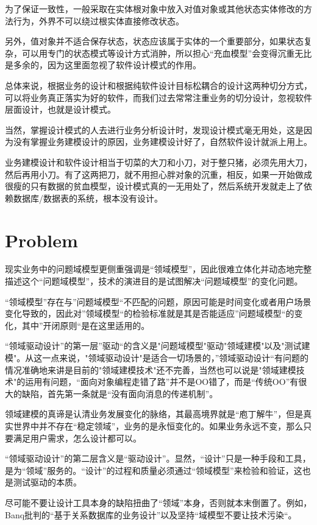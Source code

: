 为了保证一致性，一般采取在实体根对象中放入对值对象或其他状态实体修改的方法行为，外界不可以绕过根实体直接修改状态。

另外，值对象并不适合保存状态，状态应该属于实体的一个重要部分，如果状态复杂，可以用专门的状态模式等设计方式消肿，所以担心“充血模型”会变得沉重无比是多余的，因为这里面忽视了软件设计模式的作用。


总体来说，根据业务的设计和根据纯软件设计目标松耦合的设计这两种切分方式，可以将业务真正落实为好的软件，而我们过去常常注重业务的切分设计，忽视软件层面设计，也就是设计模式。


当然，掌握设计模式的人去进行业务分析设计时，发现设计模式毫无用处，这是因为没有掌握业务建模设计的原因，业务建模设计好了，自然软件设计就派上用上。

业务建模设计和软件设计相当于切菜的大刀和小刀，对于整只猪，必须先用大刀，然后再用小刀。有了这两把刀，就不用担心胖对象的沉重，相反，如果一开始做成很瘦的只有数据的贫血模型，设计模式真的一无用处了，然后系统开发就走上了依赖数据库/数据表的系统，根本没有设计。

\section{Problem}

现实业务中的问题域模型更侧重强调是“领域模型”，因此很难立体化并动态地完整描述这个“问题域模型”，技术的演进目的是试图解决“问题域模型”的变化问题。

“领域模型”存在与”问题域模型“不匹配的问题，原因可能是时间变化或者用户场景变化导致的，因此对”领域模型“的检验标准就是其是否能适应”问题域模型“的变化，其中”开闭原则“是在这里适用的。

“领域驱动设计”的第一层”驱动“的含义是"问题域模型"驱动"领域建模"以及"测试建模"。从这一点来说，"领域驱动设计"是适合一切场景的，”领域驱动设计“有问题的情况准确地来讲是目前的"领域建模技术"还不完善，当然也可以说是"领域建模技术"的运用有问题，“面向对象编程走错了路”并不是OO错了，而是“传统OO”有很大的缺陷，首先第一条就是“没有面向消息的传递机制”。

领域建模的真谛是认清业务发展变化的脉络，其最高境界就是“庖丁解牛”，但是真实世界中并不存在“稳定领域”，业务的是永恒变化的。如果业务永远不变，那么只要满足用户需求，怎么设计都可以。

“领域驱动设计”的第二层含义是“驱动设计”。显然，“设计”只是一种手段和工具，是为“领域”服务的。“设计”的过程和质量必须通过“领域模型”来检验和验证，这也是测试驱动的本质。



尽可能不要让设计工具本身的缺陷扭曲了“领域”本身，否则就本末倒置了。例如，Banq批判的“基于关系数据库的业务设计”以及坚持“域模型不要让技术污染“。

